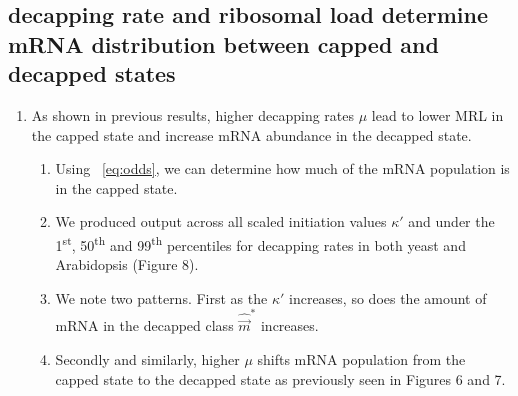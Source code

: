 \documentclass[review]{elsarticle}
\newcommand{\mvec}{\ensuremath{\vec{m}}\xspace}
\newcommand{\mvechat}{\ensuremath{\hat{\mvec}}\xspace}
\newcommand{\mvechatstar}{\ensuremath{\mvechat^*}\xspace}
\begin{document}
\subsection{decapping rate and ribosomal load determine mRNA distribution between capped and decapped states}
\begin{enumerate}
\item As shown in previous results, higher decapping rates $\mu$ lead to lower MRL in the capped state and increase mRNA abundance in the decapped state.
\begin{enumerate}
  \item Using ~\ref{eq:odds}, we can determine how much of the mRNA population is in the capped state.
  \item We produced output across all scaled initiation values $\kappa'$ and under the 1\textsuperscript{st}, 50\textsuperscript{th} and 99\textsuperscript{th} percentiles for decapping rates in both yeast and Arabidopsis (Figure 8). 
  \item We note two patterns. First as the $\kappa'$ increases, so does the amount of mRNA in the decapped class  \mvechatstar increases. 
  \item Secondly and similarly, higher $\mu$ shifts mRNA population from the capped state to the decapped state as previously seen in Figures 6 and 7.  
\end{enumerate}

\end{enumerate}




\end{document}
